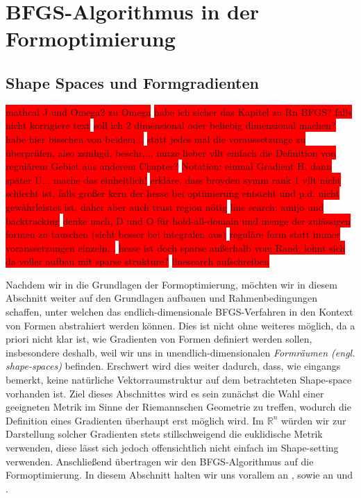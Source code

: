 
\section{BFGS-Algorithmus in der Formoptimierung}
\subsection{Shape Spaces und Formgradienten}
\label{Chap_shapespaces}

\colorbox{red}{mathcal J und Omega2 zu Omega} \newline
\colorbox{red}{habe ich sicher das Kapitel zu Rn BFGS? falls nicht korrigiere text}  \newline
\colorbox{red}{soll ich 2 dimensional oder beliebig dimensional machen? habe hier bisschen von beidem...} \newline
\colorbox{red}{ statt jedes mal die voraussetzunge zu überprüfen, also zsmhgd, beschr,... nutze lieber vllt einfach die Definition von regulärem Gebiet aus anderem Chapter?} \newline
\colorbox{red}{Notation: einmal Gradient H, dann später U... mache das einheitlich!} \newline
\colorbox{red}{erkläre, dass broyden symm rank 1 vllt nicht schlecht ist, falls großer kern der hesse bei optimierung entsteht und p.d. nicht gewährleistet ist,
daher aber auch trust region nötig} \newline
\colorbox{red}{line search: amijo und backtracking} \newline
\colorbox{red}{denke nach, D und O für hold-all-domain und menge der zulässigen formen zu tauschen (sieht besser bei integralen aus)} \newline
\colorbox{red}{reguläre form statt immer voraussetzungen einzeln...} \newline
\colorbox{red}{hesse ist doch sparse außerhalb vom Rand, lohnt sich da voller aufbau mit sparse strukture?} \newline
\colorbox{red}{linesearch aufschreiben}


Nachdem wir in die Grundlagen der Formoptimierung, möchten wir in diesem Abschnitt weiter auf den Grundlagen aufbauen und Rahmenbedingungen schaffen, unter welchen das endlich-dimensionale BFGS-Verfahren in den Kontext von Formen abstrahiert werden können. Dies ist nicht ohne weiteres möglich, da a priori nicht klar ist, wie Gradienten von Formen definiert werden sollen, insbesondere deshalb, weil wir uns in unendlich-dimensionalen \textit{Formräumen (engl. shape-spaces)} befinden. Erschwert wird dies weiter dadurch, dass, wie eingangs bemerkt, keine natürliche Vektorraumstruktur auf dem betrachteten Shape-space vorhanden ist. Ziel dieses Abschnittes wird es sein zunächst die Wahl einer geeigneten Metrik im Sinne der Riemannschen Geometrie zu treffen, wodurch die Definition eines Gradienten überhaupt erst möglich wird. Im $\mathbb{R}^n$ würden wir zur Darstellung solcher Gradienten stets stillschweigend die euklidische Metrik verwenden, diese lässt sich jedoch offensichtlich nicht einfach im Shape-setting verwenden. Anschließend übertragen wir den BFGS-Algorithmus auf die Formoptimierung. In diesem Abschnitt halten wir uns vorallem an \cite{bfgs2}, sowie an \cite{shape_space} und \cite{bfgs1}.

